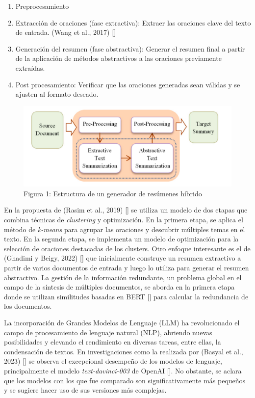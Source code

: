 \begin{enumerate}
    \item Preprocesamiento
    \item Extracción de oraciones (fase extractiva): Extraer las oraciones clave del texto de entrada. (Wang et al., 2017) [\cite{Wang}]
    \item Generación del resumen (fase abstractiva): Generar el resumen final a partir de la aplicación de métodos abstractivos a las oraciones previamente extraídas.
    \item Post procesamiento: Verificar que las oraciones generadas sean válidas y se ajusten al formato deseado.
\end{enumerate}

\begin{figure}[H]    
    \centering
    \includegraphics[scale = 1]{Figures/hybrid.png}
    \caption*{Figura 1: Estructura de un generador de resúmenes híbrido}
\end{figure}

En la propuesta de (Rasim et al., 2019) [\cite{cosum}] se utiliza un modelo de dos etapas que combina técnicas de \emph{clustering} y optimización. En la primera etapa, se aplica el método de \emph{k-means} para agrupar las oraciones y descubrir múltiples temas en el texto. En la segunda etapa, se implementa un modelo de optimización para la selección de oraciones destacadas de los clusters. Otro enfoque interesante es el de (Ghadimi y Beigy, 2022) [\cite{hybrid-llm}] que inicialmente construye un resumen extractivo a partir de varios documentos de entrada y luego lo utiliza para generar el resumen abstractivo. La gestión de la información redundante, un problema global en el campo de la síntesis de múltiples documentos, se aborda en la primera etapa donde se utilizan similitudes basadas en BERT [\cite{BERT}] para calcular la redundancia de los documentos.

La incorporación de Grandes Modelos de Lenguaje (LLM) ha revolucionado el campo de procesamiento de lenguaje natural (NLP), abriendo nuevas posibilidades y elevando el rendimiento en diversas tareas, entre ellas, la condensación de textos. En investigaciones como la realizada por (Basyal et al., 2023) [\cite{basyal2023text}] se observa el excepcional desempeño de los modelos de lenguaje, principalmente el modelo \emph{text-davinci-003} de OpenAI [\cite{openai}]. No obstante, se aclara que los modelos con los que fue comparado son significativamente más peque\~nos y se sugiere hacer uso de sus versiones más complejas.

